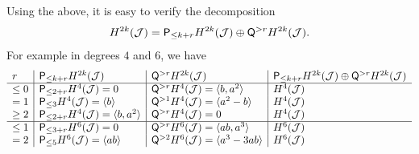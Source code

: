 \documentclass[a4paper,11pt,leqno]{amsart}
\begin{document}
\begin{ex}
Using the above, it is easy to verify the decomposition
\[
 H^{2k}(\mathcal J)
 =\mathsf{P}_{\le k+r}H^{2k}(\mathcal J)
  \oplus\mathsf{Q}^{>r}H^{2k}(\mathcal J).
\]
For example in degrees $4$ and $6$, we have
\[
\begin{array}{l|l|l|l}
r & \mathsf{P}_{\leq k+r}H^{2k}(\mathcal J) & \mathsf{Q}^{>r}H^{2k}(\mathcal J) & \mathsf{P}_{\leq k+r}H^{2k}(\mathcal J)\oplus \mathsf{Q}^{>r}H^{2k}(\mathcal J)\\
\hline
\leq 0 &\mathsf{P}_{\le 2+r}H^4(\mathcal J)=0
& \mathsf{Q}^{>r}H^4(\mathcal J)=\langle b,a^2\rangle
& H^4(\mathcal J)\\
=1 & \mathsf{P}_{\le3}H^4(\mathcal J)=\langle b\rangle
& \mathsf{Q}^{>1}H^4(\mathcal J)=\langle a^2-b\rangle
& H^4(\mathcal J)\\
\geq 2 & \mathsf{P}_{\le 2+r}H^4(\mathcal J)=\langle b,a^2\rangle
& \mathsf{Q}^{>r}H^4(\mathcal J)=0
& H^4(\mathcal J)\\ \hline
\leq 1 & \mathsf{P}_{\le 3+r}H^6(\mathcal J)=0
& \mathsf{Q}^{>r}H^6(\mathcal J)=\langle ab,a^3\rangle
& H^6(\mathcal J)\\
=2 & \mathsf{P}_{\le5}H^6(\mathcal J)=\langle ab\rangle
& \mathsf{Q}^{>2}H^6(\mathcal J)=\langle a^3-3ab\rangle
& H^6(\mathcal J)
\end{array}
\]

\end{ex}
\end{document}
